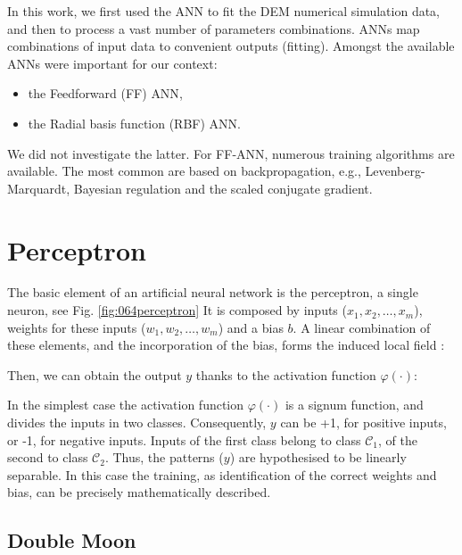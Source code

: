 In this work, we first used the \acs{ANN} to fit the \acs{DEM} numerical simulation
data, and then to process a vast number of parameters combinations. 
\acs{ANNs} map combinations of input data to convenient outputs (fitting). 
Amongst the available \acs{ANNs} were important for our context: 
\begin{itemize}
  \item {the Feedforward (\acs{FF}) \acs{ANN},}
  \item {the Radial basis function (\acs{RBF}) \acs{ANN}.}	
\end{itemize}
We did not investigate the latter.
For \acs{FF}-\acs{ANN},
numerous training algorithms are available. 
The most common are based on
backpropagation, e.g., Levenberg-Marquardt, Bayesian regulation and the scaled
conjugate gradient.

\section{Perceptron}
\label{sec:perceptron}

The basic element of an artificial neural network is the perceptron, a single
neuron, see Fig.
\ref{fig:064perceptron}
It is composed by inputs ($x_1, x_2, \ldots, x_m$), weights for these inputs
($w_1, w_2, \ldots, w_m$) and a bias $b$.
A linear combination of these elements, and the incorporation of the bias, 
forms the induced local field \cite{RefWorks:158}: 

Then, we can obtain the output $y$ thanks to the activation function
$\varphi(\cdot)$:


In the simplest case the activation function $\varphi(\cdot)$ is a signum
function, and divides the inputs in two classes.
Consequently, $y$ can be +1, for positive inputs, or -1, for negative inputs. Inputs of the first class
belong to class $\mathscr{C}_1$, of the second to class $\mathscr{C}_2$.
Thus, the patterns ($y$) are hypothesised to be linearly separable.
In this case the training, as identification of the correct weights and bias,
can be precisely mathematically described. \\


\subsection{Double Moon}
\label{subsec:doublemoon}

